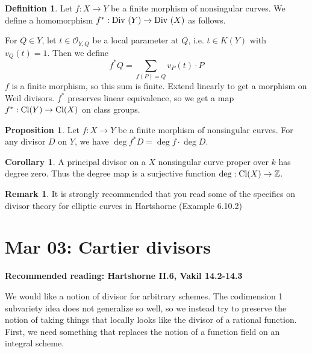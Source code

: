 \documentclass[10pt,reqno]{amsart}
\theoremstyle{definition}
\newtheorem{corollary}[theorem]{Corollary}
\newtheorem{definition}[theorem]{Definition}
\newtheorem{proposition}[theorem]{Proposition}
\newtheorem{remark}[theorem]{Remark}
\theoremstyle{remark}
\numberwithin{equation}{section}
\numberwithin{theorem}{section}
\newcommand{\Z}{{\mathbb Z}}
\newcommand{\OO}{{\mathcal O}}
\newcommand{\Div}{\textup{Div }}
\newcommand{\cl}{\textup{Cl}}
\begin{document}
\begin{definition} Let $f: X \to Y$ be a finite morphism of nonsingular curves. We define a homomorphism $f^*: \Div(Y) \to \Div(X)$ as follows.

For $Q \in Y$, let $t \in \OO_{Y,Q}$ be a local parameter at $Q$, i.e. $t \in K(Y)$ with $v_Q(t) = 1$. Then we define
\[f^*Q = \sum_{f(P) = Q} v_P(t) \cdot P\]
$f$ is a finite morphism, so this sum is finite. Extend linearly to get a morphism on Weil divisors. $f^*$ preserves linear equivalence, so we get a map $f^*: \cl(Y) \to \cl(X)$ on class groups.
\end{definition}

\begin{proposition} Let $f: X \to Y$ be a finite morphism of nonsingular curves. For any divisor $D$ on $Y$, we have $\deg f^* D = \deg f \cdot \deg D$.
\end{proposition}

\begin{corollary} A principal divisor on a $X$ nonsingular curve proper over $k$ has degree zero. Thus the degree map is a surjective function $\deg: \cl(X) \to \Z$.
\end{corollary}

\begin{remark}
It is strongly recommended that you read some of the specifics on divisor theory for elliptic curves in Hartshorne (Example 6.10.2)
\end{remark}

\section{Mar 03: Cartier divisors}
\textbf{Recommended reading: Hartshorne II.6, Vakil 14.2-14.3}

We would like a notion of divisor for arbitrary schemes. The codimension 1 subvariety idea does not generalize so well, so we instead try to preserve the notion of taking things that locally looks like the divisor of a rational function. First, we need something that replaces the notion of a  function field on an integral scheme.
\end{document}
